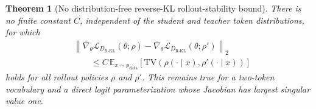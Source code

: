 \documentclass{article} %
\theoremstyle{plain}
\newtheorem{theorem}{Theorem}[section]
\theoremstyle{definition}
\theoremstyle{remark}
\begin{document}
\begin{theorem}[No distribution-free reverse-KL rollout-stability bound]
\label{thm:reverse-no-bound}
There is no finite constant $C$, independent of the student and teacher token
distributions, for which
\begin{align}
    &\left\lVert
        \bar\nabla_\theta
        \mathcal L_{D_{\mathrm{R\text{-}KL}}}(\theta;\rho)
        -
        \bar\nabla_\theta
        \mathcal L_{D_{\mathrm{R\text{-}KL}}}(\theta;\rho')
    \right\rVert_2\nonumber\\
    &\qquad\le
    C\,
    \mathbb E_{x\sim p_{\mathrm{data}}}
    \left[
        \mathrm{TV}\!\left(
            \rho(\cdot\mid x),
            \rho'(\cdot\mid x)
        \right)
    \right]
    \label{eq:reverse-impossible-bound}
\end{align}
holds for all rollout policies $\rho$ and $\rho'$.  This remains true for a
two-token vocabulary and a direct logit parameterization whose Jacobian has
largest singular value one.
\end{theorem}
\end{document}
